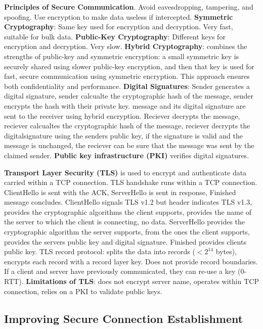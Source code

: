\documentclass{article}
\begin{document}
\vspace{\baselineskip}
\textbf{Principles of Secure Communication}. Avoid eavesdropping, tampering, and spoofing.
Use encryption to make data useless if intercepted.
\textbf{Symmetric Cryptography}: Same key used for encryption and decryption. Very fast, suitable for bulk data.
\textbf{Public-Key Cryptography}: Different keys for encryption and decryption. Very slow.
\textbf{Hybrid Cryptography}: combines the strengths of public-key and symmetric encryption:
a small symmetric key is securely shared using slower public-key encryption,
and then that key is used for fast, secure communication using symmetric encryption.
This approach ensures both confidentiality and performance.
\textbf{Digital Signatures}: Sender generates a digital signature,
sender calcualte the cryptographic hash of the message,
sender encrypts the hash with their private key.
message and its digital signature are sent to the receiver using hybrid encryption.
Reciever decrypts the message,
reciever calcualtes the cryptographic hash of the message,
reciever decrypts the digitalsignature using the senders public key,
if the signature is valid and the message is unchanged, the reciever can be sure that the message was sent by the claimed sender.
\textbf{Public key infrastructure (PKI)} verifies digital signatures.

\vspace{\baselineskip}
\textbf{Transport Layer Security (TLS)} is used to encrypt and authenticate data carried within a TCP connection.
TLS handshake runs within a TCP connection. ClientHello is sent with the ACK, ServerHello is sent in response, Finished message concludes.
ClientHello signals TLS v1.2 but header indicates TLS v1.3, provides the cryptographic algorithms the client supports,
provides the name of the server to which the client is connecting, no data.
ServerHello provides the cryptographic algorithm the server supports, from the ones the client supports,
provides the servers public key and digital signature.
Finished provides clients public key.
TLS record protocol: splits the data into records ($< 2^{14}$ bytes), encrypts each record with a record layer key.
Does not provide record boundaries.
If a client and server have previously communicated, they can re-use a key (0-RTT).
\textbf{Limitations of TLS}: does not encrypt server name, operates within TCP connection, relies on a PKI to validate public keys.


\clearpage

\subsection*{Improving Secure Connection Establishment}
\end{document}
